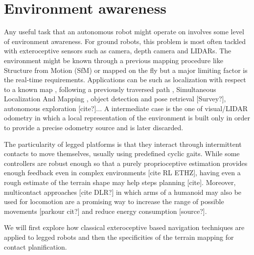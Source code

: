 \section{Environment awareness}
Any useful task that an autonomous robot might operate on involves some level of environment awareness. For ground robots, 
this problem is most often tackled with exteroceptive sensors such as camera, depth camera and LIDARs.
The environment might be known through a previous mapping procedure like Structure from Motion (SfM) \cite{triggs1999bundle} or mapped on the fly but a major limiting 
factor is the real-time requirements. Applications can be such as localization with respect to a known map \cite{dellaert1999monte},
following a previously traversed path \cite{furgale2010visual}, Simultaneous Localization And Mapping \cite{aulinas2008slam, cadena2016past}, object detection and pose retrieval [Survey?], 
autonomous exploration [cite?]... A intermediate case is the one of visual/LIDAR odometry in which a local representation of the environment is built
only in order to provide a precise odometry source \cite{scaramuzza2011visual} and is later discarded. 

The particularity of legged platforms is that they interact through intermittent contacts to move themselves, usually using predefined cyclic gaits. While some controllers are 
robust enough so that a purely proprioceptive estimation provides enough feedback even in complex environments [cite RL ETHZ], having even a rough estimate of 
the terrain shape may help steps planning [cite]. Moreover, multicontact approaches \cite{carpentier2017multi} [cite DLR?] in which arms of a humanoid may also be used 
for locomotion are a promising way to increase the range of possible movements [parkour cit?] and reduce energy consumption [source?]. 

We will first explore how classical exteroceptive based navigation techniques are applied to legged robots and then the specificities of the 
terrain mapping for contact planification.

